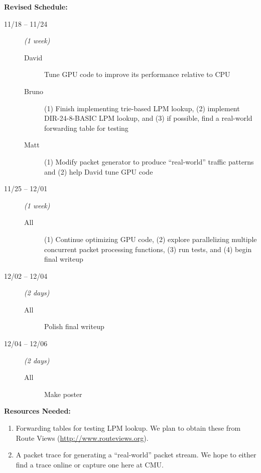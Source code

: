 \documentclass[12pt]{article}
\begin{document}
\noindent \textbf{Revised Schedule:}
\begin{description}
	\item[11/18 -- 11/24] \emph{(1 week)} \hfill
	\begin{description}
		\item[David] Tune GPU code to improve its performance relative to CPU
		\item[Bruno] (1) Finish implementing trie-based LPM lookup, (2) implement DIR-24-8-BASIC LPM lookup, and (3) if possible, find a real-world forwarding table for testing
		\item[Matt] (1) Modify packet generator to produce ``real-world'' traffic patterns and (2) help David tune GPU code
	\end{description}
	
	\item[11/25 -- 12/01] \emph{(1 week)} \hfill
	\begin{description}
		\item[All] (1) Continue optimizing GPU code, (2) explore parallelizing multiple concurrent packet processing functions, (3) run tests, and (4) begin final writeup
	\end{description}
	
	\item[12/02 -- 12/04] \emph{(2 days)} \hfill
	\begin{description}
		\item[All] Polish final writeup
	\end{description}
	
	\item[12/04 -- 12/06] \emph{(2 days)} \hfill
	\begin{description}
		\item[All] Make poster
	\end{description}
\end{description}

\vspace{0.3 cm}

\noindent \textbf{Resources Needed:}
\begin{enumerate}
	\item Forwarding tables for testing LPM lookup. We plan to obtain these from Route Views (\url{http://www.routeviews.org}).
	
	\item A packet trace for generating a ``real-world'' packet stream. We hope to either find a trace online or capture one here at CMU.
\end{enumerate}
\end{document}
